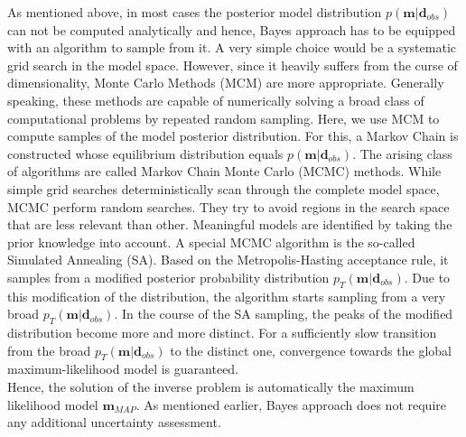 As mentioned above, in most cases the posterior model distribution $p(\mathbf{m}|\mathbf{d}_{obs})$ can not be computed analytically and hence, Bayes approach has to be equipped with an algorithm to sample from it.
A very simple choice would be a systematic grid search in the model space.
However, since it heavily suffers from the curse of dimensionality, Monte Carlo Methods (MCM) are more appropriate.
Generally speaking, these methods are capable of numerically solving a broad class of computational problems by repeated random sampling.
Here, we use MCM to compute samples of the model posterior distribution.
For this, a Markov Chain is constructed whose equilibrium distribution equals $p(\mathbf{m}|\mathbf{d}_{obs})$.
The arising class of algorithms are called Markov Chain Monte Carlo (MCMC) methods.
While simple grid searches deterministically scan through the complete model space, MCMC perform random searches.
They try to avoid regions in the search space that are less relevant than other.
Meaningful models are identified by taking the prior knowledge into account.\newline
A special MCMC algorithm is the so-called Simulated Annealing (SA).
Based on the Metropolis-Hasting acceptance rule, it samples from a modified posterior probability distribution $p_T(\mathbf{m}|\mathbf{d}_{obs})$.
Due to this modification of the distribution, the algorithm starts sampling from a very broad $p_T(\mathbf{m}|\mathbf{d}_{obs})$.
In the course of the SA sampling, the peaks of the modified distribution become more and more distinct.
For a sufficiently slow transition from the broad $p_T(\mathbf{m}|\mathbf{d}_{obs})$ to the distinct one, convergence towards the global maximum-likelihood model is guaranteed.\\
Hence, the solution of the inverse problem is automatically the maximum likelihood model $\mathbf{m}_{MAP}$.
As mentioned earlier, Bayes approach does not require any additional uncertainty assessment.